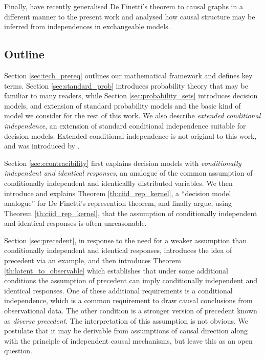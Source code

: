 \documentclass{article}
\begin{document}
Finally, \citet{guoCausalFinettiIdentification2022} have recently generalised De Finetti's theorem to causal graphs in a different manner to the present work and analysed how causal structure may be inferred from independences in exchangeable models.

\subsection{Outline}

Section \ref{sec:tech_prereq} outlines our mathematical framework and defines key terms. Section \ref{sec:standard_prob} introduces probability theory that may be familiar to many readers, while Section \ref{sec:probability_sets} introduces decision models, and extension of standard probability models and the basic kind of model we consider for the rest of this work. We also describe \emph{extended conditional independence}, an extension of standard conditional independence suitable for decision models. Extended conditional independence is not original to this work, and was introduced by \citet{constantinou_extended_2017}.

Section \ref{sec:ccontracibility} first explains decision models with \emph{conditionally independent and identical responses}, an analogue of the common assumption of conditionally independent and identicallly distributed variables. We then introduce and explains Theorem \ref{th:ciid_rep_kernel}, a ``decision model analogue'' for De Finetti's represention theorem, and finally argue, using Theorem \ref{th:ciid_rep_kernel}, that the assumption of conditionally independent and identical responses is often unreasonable.

Section \ref{sec:precedent}, in response to the need for a weaker assumption than conditionally independent and identical responses, introduces the idea of precedent via an example, and then introduces Theorem \ref{th:latent_to_observable} which establishes that under some additional conditions the assumption of precedent can imply conditionally independent and identical responses. One of these additional requirements is a conditional independence, which is a common requirement to draw causal conclusions from observational data. The other condition is a stronger version of precedent known as \emph{diverse precedent}. The interpretation of this assumption is not obvious. We postulate that it may be derivable from assumptions of causal direction along with the principle of independent causal mechanisms, but leave this as an open question.









\appendix


\end{document}
